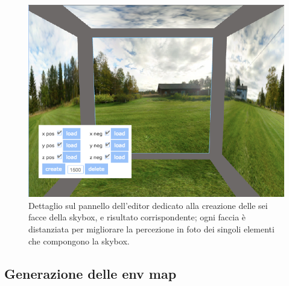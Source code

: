 \\
\begin{figure}[h]
 \centering
 \includegraphics[width=0.8\linewidth]{images/chapter_creazione_scena/editor_4.png}\hfill
 \caption[Creazione Skybox]{Dettaglio sul pannello dell'editor dedicato alla creazione delle sei facce della skybox, e risultato corrispondente; ogni faccia è distanziata per migliorare la percezione in foto dei singoli elementi che compongono la skybox.}
 \label{fig:editor_4}
\end{figure} 

\subsection{Generazione delle env map}
\label{sec:chapter_creazione_scena_funzionalita_editor_envmap}

